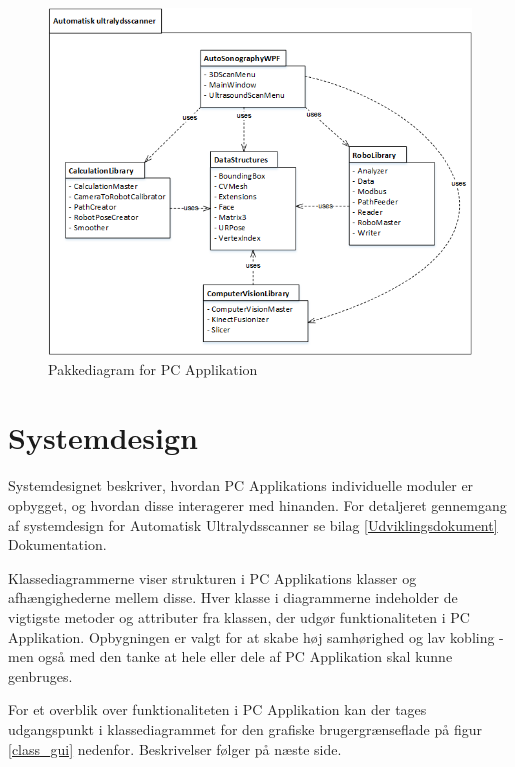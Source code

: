 \begin{figure}[H]
    \centering
    \includegraphics[width=1\textwidth]{figurer/d/Design/Pakkediagram}
    \caption{Pakkediagram for PC Applikation}
    \label{pakke}
\end{figure}

\newpage
\section{Systemdesign} \label{Systemdesign}
Systemdesignet beskriver, hvordan PC Applikations individuelle moduler er opbygget, og hvordan disse interagerer med hinanden. For detaljeret gennemgang af systemdesign for Automatisk Ultralydsscanner se bilag \ref{Udviklingsdokument} Dokumentation.

Klassediagrammerne viser strukturen i PC Applikations klasser og afhængighederne mellem disse. Hver klasse i diagrammerne indeholder de vigtigste metoder og attributer fra klassen, der udgør funktionaliteten i PC Applikation. Opbygningen er valgt for at skabe høj samhørighed og lav kobling - men også med den tanke at hele eller dele af PC Applikation skal kunne genbruges.

For et overblik over funktionaliteten i PC Applikation kan der tages udgangspunkt i klassediagrammet for den grafiske brugergrænseflade på figur \ref{class_gui} nedenfor. Beskrivelser følger på næste side. 

